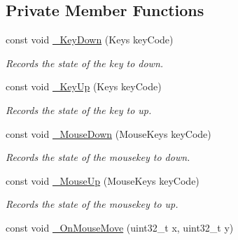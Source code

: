 \subsection*{Private Member Functions}
\begin{DoxyCompactItemize}
\item 
const void \hyperlink{class_ensum_1_1_input_1_1_input_ad8eda827bc3b8f09c907daabd5514c22}{\+\_\+\+Key\+Down} (Keys key\+Code)\hypertarget{class_ensum_1_1_input_1_1_input_ad8eda827bc3b8f09c907daabd5514c22}{}\label{class_ensum_1_1_input_1_1_input_ad8eda827bc3b8f09c907daabd5514c22}

\begin{DoxyCompactList}\small\item\em Records the state of the key to down. \end{DoxyCompactList}\item 
const void \hyperlink{class_ensum_1_1_input_1_1_input_a5918ced1e19d0a221e8ca01a672c93d7}{\+\_\+\+Key\+Up} (Keys key\+Code)\hypertarget{class_ensum_1_1_input_1_1_input_a5918ced1e19d0a221e8ca01a672c93d7}{}\label{class_ensum_1_1_input_1_1_input_a5918ced1e19d0a221e8ca01a672c93d7}

\begin{DoxyCompactList}\small\item\em Records the state of the key to up. \end{DoxyCompactList}\item 
const void \hyperlink{class_ensum_1_1_input_1_1_input_acaed245a2c82297fc861c2c78ccb14c8}{\+\_\+\+Mouse\+Down} (Mouse\+Keys key\+Code)\hypertarget{class_ensum_1_1_input_1_1_input_acaed245a2c82297fc861c2c78ccb14c8}{}\label{class_ensum_1_1_input_1_1_input_acaed245a2c82297fc861c2c78ccb14c8}

\begin{DoxyCompactList}\small\item\em Records the state of the mousekey to down. \end{DoxyCompactList}\item 
const void \hyperlink{class_ensum_1_1_input_1_1_input_a471b38d0c16fa0250334beb664456d3b}{\+\_\+\+Mouse\+Up} (Mouse\+Keys key\+Code)\hypertarget{class_ensum_1_1_input_1_1_input_a471b38d0c16fa0250334beb664456d3b}{}\label{class_ensum_1_1_input_1_1_input_a471b38d0c16fa0250334beb664456d3b}

\begin{DoxyCompactList}\small\item\em Records the state of the mousekey to up. \end{DoxyCompactList}\item 
const void \hyperlink{class_ensum_1_1_input_1_1_input_a75f307dacc5078275fdd6851b7d32bbd}{\+\_\+\+On\+Mouse\+Move} (uint32\+\_\+t x, uint32\+\_\+t y)\hypertarget{class_ensum_1_1_input_1_1_input_a75f307dacc5078275fdd6851b7d32bbd}{}\label{class_ensum_1_1_input_1_1_input_a75f307dacc5078275fdd6851b7d32bbd}


\end{DoxyCompactItemize}
